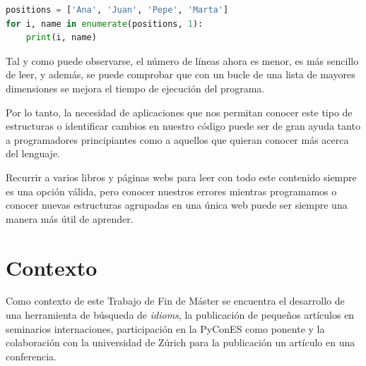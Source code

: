\documentclass[a4paper, 12pt]{book}
\begin{document}
\begin{lstlisting}[language=Python, basicstyle=\small]
positions = ['Ana', 'Juan', 'Pepe', 'Marta']
for i, name in enumerate(positions, 1):
    print(i, name)
\end{lstlisting}

Tal y como puede observarse, el número de líneas ahora es menor, es más sencillo de leer, y además, se puede comprobar que con un bucle de una lista de mayores dimensiones se mejora el tiempo de ejecución del programa.

Por lo tanto, la necesidad de aplicaciones que nos permitan conocer este tipo de estructuras o identificar cambios en nuestro código puede ser de gran ayuda tanto a programadores principiantes como a aquellos que quieran conocer más acerca del lenguaje.

Recurrir a varios libros y páginas webs para leer con todo este contenido siempre es una opción válida, pero conocer nuestros errores mientras programamos o conocer nuevas estructuras agrupadas en una única web puede ser siempre una manera más útil de aprender.

\section{Contexto}
\label{contexto}

Como contexto de este Trabajo de Fin de Máster se encuentra el desarrollo de una herramienta de búsqueda de \textit{idioms}, la publicación de pequeños artículos en seminarios internaciones, participación en la PyConES como ponente y la colaboración con la universidad de Zúrich para la publicación un artículo en una conferencia.
\end{document}
